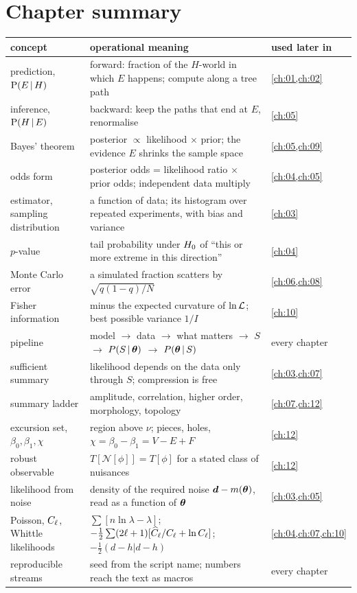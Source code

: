 \section*{Chapter summary}

\begingroup
\small
\renewcommand{\arraystretch}{1.3}
\begin{tabularx}{\linewidth}{@{}>{\raggedright\arraybackslash}p{3.0cm}
  >{\raggedright\arraybackslash}X >{\raggedright\arraybackslash}p{2.4cm}@{}}
\toprule
\textbf{concept} & \textbf{operational meaning} & \textbf{used later in}\\
\midrule
prediction, $\operatorname{P}(E\,\vert\, H)$ & forward: fraction of the $H$-world in which $E$ happens; compute along a tree path & \cref{ch:01,ch:02}\\
inference, $\operatorname{P}(H\,\vert\, E)$ & backward: keep the paths that end at $E$, renormalise & \cref{ch:05}\\
Bayes' theorem & posterior $\propto$ likelihood $\times$ prior; the evidence $E$ shrinks the sample space & \cref{ch:05,ch:09}\\
odds form & posterior odds = likelihood ratio $\times$ prior odds; independent data multiply & \cref{ch:04,ch:05}\\
estimator, sampling distribution & a function of data; its histogram over repeated experiments, with bias and variance & \cref{ch:03}\\
$p$-value & tail probability under $H_0$ of ``this or more extreme in this direction'' & \cref{ch:04}\\
Monte Carlo error & a simulated fraction scatters by $\sqrt{q(1-q)/N}$ & \cref{ch:06,ch:08}\\
Fisher information & minus the expected curvature of $\ln\mathcal{L}$; best possible variance $1/I$ & \cref{ch:10}\\
pipeline & model $\to$ data $\to$ what matters $\to$ $S$ $\to$ $P(S\,\vert\,\bm{\theta})$ $\to$ $P(\bm{\theta}\,\vert\, S)$ & every chapter\\
sufficient summary & likelihood depends on the data only through $S$; compression is free & \cref{ch:03,ch:07}\\
summary ladder & amplitude, correlation, higher order, morphology, topology & \cref{ch:07,ch:12}\\
excursion set, $\beta_0,\beta_1,\chi$ & region above $\nu$; pieces, holes, $\chi=\beta_0-\beta_1=V-E+F$ & \cref{ch:12}\\
robust observable & $T[\mathcal N[\phi]]=T[\phi]$ for a stated class of nuisances & \cref{ch:12}\\
likelihood from noise & density of the required noise $\bm{d}-m(\bm{\theta})$, read as a function of $\bm{\theta}$ & \cref{ch:03,ch:05}\\
Poisson, $C_\ell$, Whittle likelihoods & $\sum[n\ln\lambda-\lambda]$; $-\frac12\sum(2\ell+1)[\widehat{C}_\ell/C_\ell+\ln C_\ell]$; $-\frac12(d-h|d-h)$ & \cref{ch:04,ch:07,ch:10}\\
reproducible streams & seed from the script name; numbers reach the text as macros & every chapter\\
\bottomrule
\end{tabularx}
\endgroup

